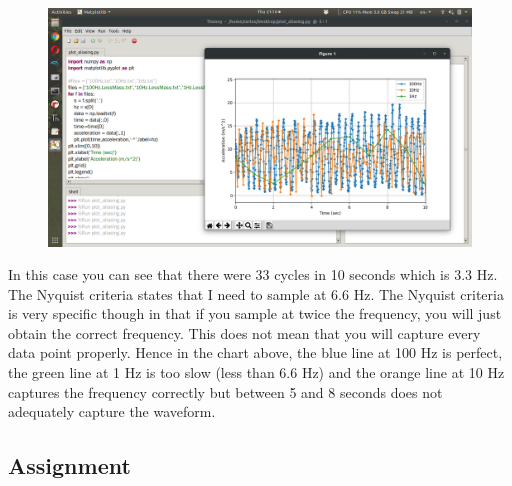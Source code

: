 \begin{figure}[H]
  \begin{center}
    \includegraphics[width=\textwidth]{Figures/aliasing2.png}
  \end{center}
\end{figure}
In this case you can see that there were 33 cycles in 10 seconds which is 3.3 Hz. The Nyquist criteria states that I need to sample at 6.6 Hz. The Nyquist criteria is very specific though in that if you sample at twice the frequency, you will just obtain the correct frequency. This does not mean that you will capture every data point properly. Hence in the chart above, the blue line at 100 Hz is perfect, the green line at 1 Hz is too slow (less than 6.6 Hz) and the orange line at 10 Hz captures the frequency correctly but between 5 and 8 seconds does not adequately capture the waveform.

\subsection{Assignment}



